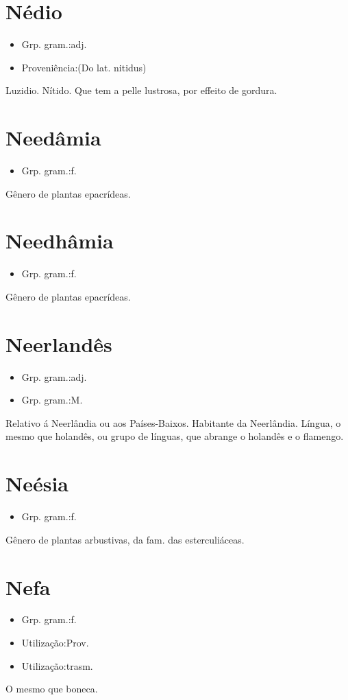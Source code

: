\section{Nédio}
\begin{itemize}
\item {Grp. gram.:adj.}
\end{itemize}
\begin{itemize}
\item {Proveniência:(Do lat. \textunderscore nitidus\textunderscore )}
\end{itemize}
Luzidio.
Nítido.
Que tem a pelle lustrosa, por effeito de gordura.
\section{Needâmia}
\begin{itemize}
\item {Grp. gram.:f.}
\end{itemize}
Gênero de plantas epacrídeas.
\section{Needhâmia}
\begin{itemize}
\item {Grp. gram.:f.}
\end{itemize}
Gênero de plantas epacrídeas.
\section{Neerlandês}
\begin{itemize}
\item {Grp. gram.:adj.}
\end{itemize}
\begin{itemize}
\item {Grp. gram.:M.}
\end{itemize}
Relativo á Neerlândia ou aos Países-Baixos.
Habitante da Neerlândia.
Língua, o mesmo que \textunderscore holandês\textunderscore , ou grupo de línguas, que abrange o holandês e o flamengo.
\section{Neésia}
\begin{itemize}
\item {Grp. gram.:f.}
\end{itemize}
Gênero de plantas arbustivas, da fam. das esterculiáceas.
\section{Nefa}
\begin{itemize}
\item {Grp. gram.:f.}
\end{itemize}
\begin{itemize}
\item {Utilização:Prov.}
\end{itemize}
\begin{itemize}
\item {Utilização:trasm.}
\end{itemize}
O mesmo que \textunderscore boneca\textunderscore .
